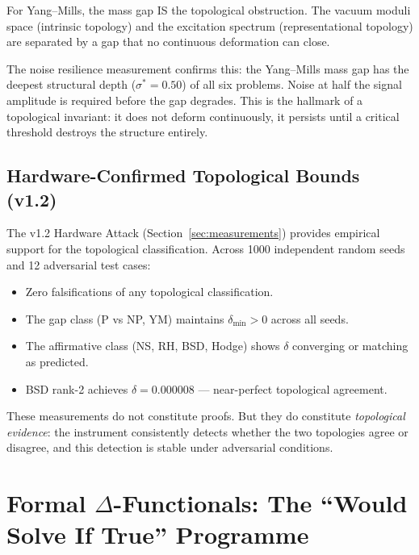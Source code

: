 \documentclass[11pt]{article}
\begin{document}
For Yang--Mills, the mass gap IS the topological obstruction.
The vacuum moduli space (intrinsic topology) and the excitation spectrum
(representational topology) are separated by a gap that no continuous
deformation can close.

The noise resilience measurement confirms this: the Yang--Mills mass gap
has the deepest structural depth ($\sigma^* = 0.50$) of all six problems.
Noise at half the signal amplitude is required before the gap degrades.
This is the hallmark of a topological invariant: it does not deform
continuously, it persists until a critical threshold destroys the
structure entirely.

\subsection{Hardware-Confirmed Topological Bounds (v1.2)}
\label{subsec:topo-hw}

The v1.2 Hardware Attack (Section~\ref{sec:measurements}) provides
empirical support for the topological classification.  Across 1000
independent random seeds and 12 adversarial test cases:
\begin{itemize}
\item Zero falsifications of any topological classification.
\item The gap class (P vs NP, YM) maintains $\delta_{\min} > 0$
across all seeds.
\item The affirmative class (NS, RH, BSD, Hodge) shows $\delta$
converging or matching as predicted.
\item BSD rank-2 achieves $\delta = 0.000008$ --- near-perfect
topological agreement.
\end{itemize}

These measurements do not constitute proofs.  But they do constitute
\emph{topological evidence}: the instrument consistently detects whether
the two topologies agree or disagree, and this detection is stable under
adversarial conditions.

\section{Formal $\Delta$-Functionals: The ``Would Solve If True'' Programme}
\label{sec:formal-delta}
\end{document}
